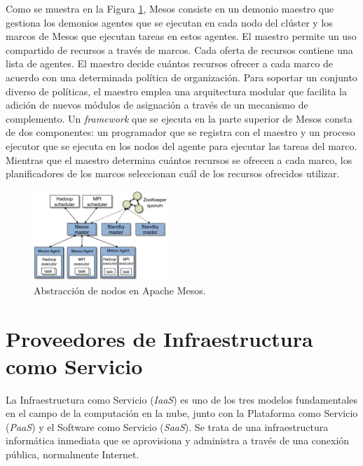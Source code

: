 
Como se muestra en la Figura \ref{fig:apachemesos}, Mesos consiste en un demonio maestro que gestiona los demonios agentes que se ejecutan en cada nodo del clúster y los marcos de Mesos que ejecutan tareas en estos agentes. El maestro permite un uso compartido de recursos a través de marcos. Cada oferta de recursos contiene una lista de agentes. El maestro decide cuántos recursos ofrecer a cada marco de acuerdo con una determinada política de organización. Para soportar un conjunto diverso de políticas, el maestro emplea una arquitectura modular que facilita la adición de nuevos módulos de asignación a través de un mecanismo de complemento. Un \textit{framework} que se ejecuta en la parte superior de Mesos consta de dos componentes: un programador que se registra con el maestro y un proceso ejecutor que se ejecuta en los nodos del agente para ejecutar las tareas del marco. Mientras que el maestro determina cuántos recursos se ofrecen a cada marco, los planificadores de los marcos seleccionan cuál de los recursos ofrecidos utilizar.

\begin{figure}[H]
\centering
\includegraphics[width=0.45\textwidth]{images/figures/apachemesos.png}
\caption{Abstracción de nodos en Apache Mesos.\footnotemark \label{fig:apachemesos}}
\end{figure}


\section{Proveedores de Infraestructura como Servicio}

La Infraestructura como Servicio (\textit{IaaS}) es uno de los tres modelos fundamentales en el campo de la computación en la nube, junto con la Plataforma como Servicio (\textit{PaaS}) y el Software como Servicio (\textit{SaaS}). Se trata de una infraestructura informática inmediata que se aprovisiona y administra a través de una conexión pública, normalmente Internet.

